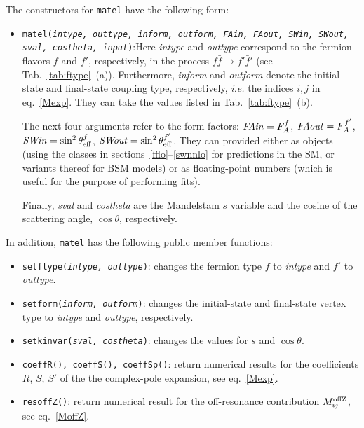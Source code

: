 \documentclass[12pt]{article}
\newcommand{\seff}[1]{\sin^2\theta_{\rm eff}^{#1}}
\newcommand{\fva}[1]{F_{V,A}^{#1}}
\begin{document}
\medskip\noindent
The constructors for \texttt{matel} have the following form:
\begin{itemize}
    \item \texttt{matel({\rm\it intype, outtype, inform, outform, FAin, FAout, SWin, SWout, sval, costheta, input})}:\newline Here \textit{intype} and \textit{outtype} correspond to the fermion flavors $f$ and $f'$, respectively, in the process $f\bar{f} \to f'\bar{f}'$ (see Tab.~\ref{tab:ftype}~(a)). Furthermore,  \textit{inform} and \textit{outform} denote the initial-state and final-state coupling type, respectively, \emph{i.e.} the indices $i,j$ in eq.~\eqref{Mexp}. They can take the values listed in Tab.~\ref{tab:ftype}~(b).
    
The next four arguments refer to the form factors: ${\it FAin} = F_A^f$, ${\it FAout} = F_A^{f'}$, ${\it SWin} = \seff{f}$, ${\it SWout} = \seff{f'}$. They can provided either as objects (using the classes in sections~\ref{fflo}--\ref{swnnlo} for predictions in the SM, or variants thereof for BSM models) or as floating-point numbers (which is useful for the purpose of performing fits).

Finally, \textit{sval} and \textit{costheta} are the Mandelstam $s$ variable and the cosine of the scattering angle, $\cos\theta$, respectively.
\end{itemize}
In addition, \texttt{matel} has the following public member functions:
\begin{itemize}
    \item \texttt{setftype({\rm\it intype, outtype})}: changes the fermion type $f$ to {\it intype} and $f'$ to {\it outtype}.
    \item \texttt{setform({\rm\it inform, outform})}: changes the initial-state and final-state vertex type to \textit{intype} and \textit{outtype}, respectively.
    \item \texttt{setkinvar({\rm\it sval, costheta})}: changes the values for $s$ and $\cos\theta$.
    \item \texttt{coeffR(), coeffS(), coeffSp()}: return numerical results for the coefficients $R$, $S$, $S'$ of the the complex-pole expansion, see eq.~\eqref{Mexp}.
    \item \texttt{resoffZ()}: return numerical result for the off-resonance contribution $M_{ij}^{\rm offZ}$, see eq.~\eqref{MoffZ}.
\end{itemize}

\end{document}

